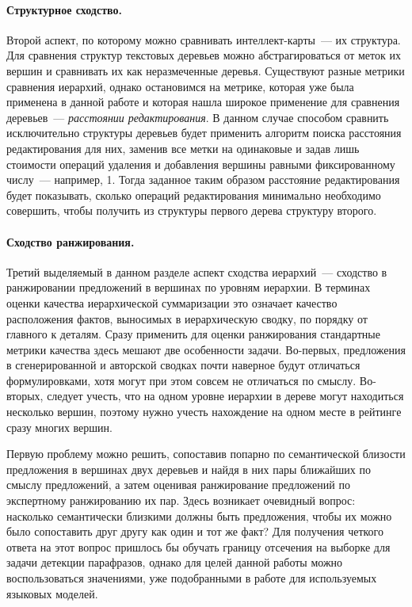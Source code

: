 \documentclass[12pt]{article}
\begin{document}
\paragraph{Структурное сходство.} Второй аспект, по которому можно сравнивать интеллект-карты~--- их структура. Для сравнения структур текстовых деревьев можно абстрагироваться от меток их вершин и сравнивать их как неразмеченные деревья. Существуют разные метрики сравнения иерархий, однако остановимся на метрике, которая уже была применена в данной работе и которая нашла широкое применение для сравнения деревьев~--- \textit{расстоянии редактирования}. В данном случае способом сравнить исключительно структуры деревьев будет применить алгоритм поиска расстояния редактирования для них, заменив все метки на одинаковые и задав лишь стоимости операций удаления и добавления вершины равными фиксированному числу~--- например, 1. Тогда заданное таким образом расстояние редактирования будет показывать, сколько операций редактирования минимально необходимо совершить, чтобы получить из структуры первого дерева структуру второго. 

\paragraph{Сходство ранжирования.} Третий выделяемый в данном разделе аспект сходства иерархий~--- сходство в ранжировании предложений в вершинах по уровням иерархии. В терминах оценки качества иерархической суммаризации это означает качество расположения фактов, выносимых в иерархическую сводку, по порядку от главного к деталям. Сразу применить для оценки ранжирования стандартные метрики качества здесь мешают две особенности задачи. Во-первых, предложения в сгенерированной и авторской сводках почти наверное будут отличаться формулировками, хотя могут при этом совсем не отличаться по смыслу. Во-вторых, следует учесть, что на одном уровне иерархии в дереве могут находиться несколько вершин, поэтому нужно учесть нахождение на одном месте в рейтинге сразу многих вершин.

Первую проблему можно решить, сопоставив попарно по семантической близости предложения в вершинах двух деревьев и найдя в них пары ближайших по смыслу предложений, а затем оценивая ранжирование предложений по экспертному ранжированию их пар. Здесь возникает очевидный вопрос: насколько семантически близкими должны быть предложения, чтобы их можно было сопоставить друг другу как один и тот же факт? Для получения четкого ответа на этот вопрос пришлось бы обучать границу отсечения на выборке для задачи детекции парафразов, однако для целей данной работы можно воспользоваться значениями, уже подобранными в работе \cite{vrbanec2023comparison} для используемых языковых моделей.
\end{document}
